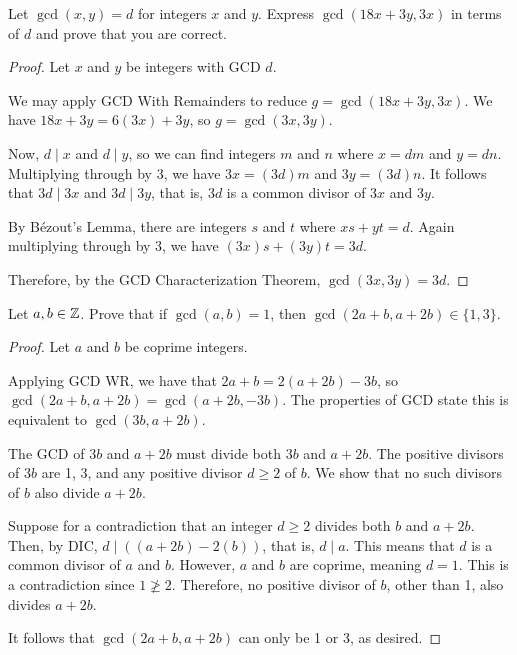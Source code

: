 \documentclass{agony}
\begin{document}
\question Let $\gcd(x, y) = d$ for integers $x$ and $y$.
Express $\gcd(18x + 3y, 3x)$ in terms of $d$ and prove that you are correct.
\begin{proof}
  Let $x$ and $y$ be integers with GCD $d$.

  We may apply GCD With Remainders to reduce $g=\gcd(18x+3y,3x)$.
  We have $18x+3y = 6(3x) + 3y$, so $g=\gcd(3x,3y)$.

  Now, $d \mid x$ and $d \mid y$, so we can find integers $m$ and $n$ where $x = dm$ and $y = dn$.
  Multiplying through by 3, we have $3x = (3d)m$ and $3y = (3d)n$.
  It follows that $3d \mid 3x$ and $3d \mid 3y$, that is, $3d$ is a common divisor of $3x$ and $3y$.

  By Bézout's Lemma, there are integers $s$ and $t$ where $xs+yt=d$.
  Again multiplying through by 3, we have $(3x)s+(3y)t=3d$.

  Therefore, by the GCD Characterization Theorem, $\gcd(3x,3y) = 3d$.
\end{proof}


\question Let $a,b\in\mathbb{Z}$. Prove that if $\gcd(a, b) = 1$, then $\gcd(2a+b, a+2b) \in \{1,3\}$.
\begin{proof}
  Let $a$ and $b$ be coprime integers.

  Applying GCD WR, we have that $2a+b = 2(a+2b)-3b$, so $\gcd(2a+b,a+2b)=\gcd(a+2b,-3b)$.
  The properties of GCD state this is equivalent to $\gcd(3b,a+2b)$.

  The GCD of $3b$ and $a+2b$ must divide both $3b$ and $a+2b$.
  The positive divisors of $3b$ are 1, 3, and any positive divisor $d \geq 2$ of $b$.
  We show that no such divisors of $b$ also divide $a+2b$.

  Suppose for a contradiction that an integer $d \geq 2$ divides both $b$ and $a+2b$.
  Then, by DIC, $d \mid ((a+2b)-2(b))$, that is, $d \mid a$.
  This means that $d$ is a common divisor of $a$ and $b$.
  However, $a$ and $b$ are coprime, meaning $d=1$.
  This is a contradiction since $1 \not\geq 2$.
  Therefore, no positive divisor of $b$, other than 1, also divides $a+2b$.

  It follows that $\gcd(2a+b,a+2b)$ can only be 1 or 3, as desired.
\end{proof}
\end{document}
